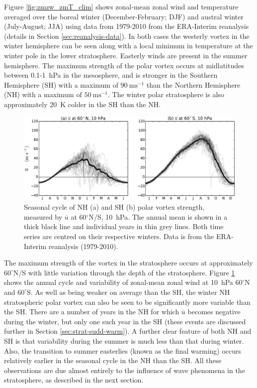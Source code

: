 Figure \ref{fig:zmzw_zmT_clim} shows zonal-mean zonal wind and temperature
averaged over the boreal winter (December-February; DJF) and austral winter
(July-August; JJA) using data from 1979-2010 from the ERA-Interim reanalysis
(details in Section \ref{sec:reanalysis-data}). In both cases the westerly
vortex in the winter hemisphere can be seen along with a local minimum in
temperature at the winter pole in the lower stratosphere. Easterly winds are
present in the summer hemisphere. The maximum strength of the polar vortex
occurs at midlatitudes between 0.1-1~hPa in the mesosphere, and is stronger in
the Southern Hemisphere (SH) with a maximum of $90~\mathrm{ms^{-1}}$ than the
Northern Hemisphere (NH) with a maximum of $50~\mathrm{ms^{-1}}$. The winter
polar stratosphere is also approximately 20~K colder in the SH than the NH.

\begin{figure}
 \centering
 \noindent\includegraphics[width=\textwidth]{figures/chapter-intro/zmzw_NH_SH.pdf}
 \caption[Comparison of NH and SH polar vortex seasonal cycle.]{Seasonal cycle
   of NH (a) and SH (b) polar vortex strength, measured by $\overline{u}$ at
   60$^{\circ}$N/S, 10~hPa. The annual mean is shown in a thick black line and
   individual years in thin grey lines. Both time series are centred on their
   respective winters. Data is from the ERA-Interim reanalysis (1979-2010).}
 \label{fig:zmzw_NH_SH}
\end{figure}

The maximum strength of the vortex in the stratosphere occurs at approximately
$60^{\circ}$N/S with little variation through the depth of the
stratosphere. Figure \ref{fig:zmzw_NH_SH} shows the annual cycle and variability
of zonal-mean zonal wind at 10~hPa $60^{\circ}$N and $60^{\circ}$S. As well as
being weaker on average than the SH, the winter NH stratospheric polar vortex
can also be seen to be significantly more variable than the SH. There are a
number of years in the NH for which $\overline{u}$ becomes negative during the
winter, but only one such year in the SH (these events are discussed further in
Section \ref{sec:strat-sudd-warm}). A further clear feature of both NH and SH is
that variability during the summer is much less than that during winter. Also,
the transition to summer easterlies (known as the final warming) occurs
relatively earlier in the seasonal cycle in the NH than the SH. All these
observations are due almost entirely to the influence of wave phenomena in the
stratosphere, as described in the next section.


